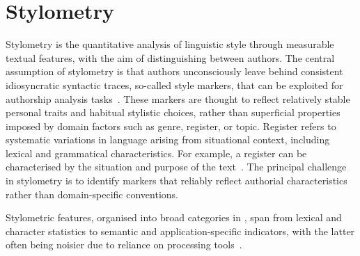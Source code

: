 \section{Stylometry}
\label{sec:stylometry}

Stylometry is the quantitative analysis of linguistic style through measurable textual features, with the aim of distinguishing between authors.
The central assumption of stylometry is that authors unconsciously leave behind consistent idiosyncratic syntactic traces, so-called style markers, that can be exploited for authorship analysis tasks~\citep{neal_surveying_2018}. 
These markers are thought to reflect relatively stable personal traits and habitual stylistic choices, rather than superficial properties imposed by domain factors such as genre, register, or topic.
Register refers to systematic variations in language arising from situational context, including lexical and grammatical characteristics.
For example, a register can be characterised by the situation and purpose of the text~\citep{register_2025,register_2019}. 
The principal challenge in stylometry is to identify markers that reliably reflect authorial characteristics rather than domain-specific conventions.

Stylometric features, organised into broad categories in , span from lexical and character statistics to semantic and application-specific indicators, with the latter often being noisier due to reliance on processing tools~\citep{stamatatos_survey_2009}.



